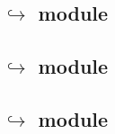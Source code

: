 \subsection{\txnSystemMod{} $\hookrightarrow$ \wcpMod{} module}               \label{system transaction: lookups: wcp}                            
\subsection{\txnSystemMod{} $\hookrightarrow$ \eucMod{} module}               \label{system transaction: lookups: euc}                            
\subsection{\txnSystemMod{} $\hookrightarrow$ \btcMod{} module}               \label{system transaction: lookups: block data}                     
